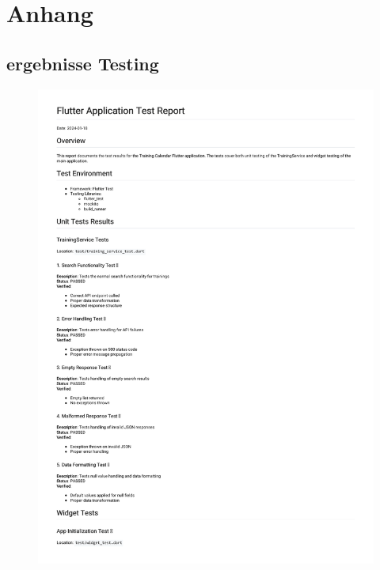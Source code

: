 \chapter{Anhang}
\label{Anhang}

\section{ergebnisse Testing}


\begin{figure}[htbp!]
    \centering
    \includegraphics[scale=0.7]{img/Markdown to PDF.pdf}
    \label{TEstprotokoll Flutter}
\end{figure}


